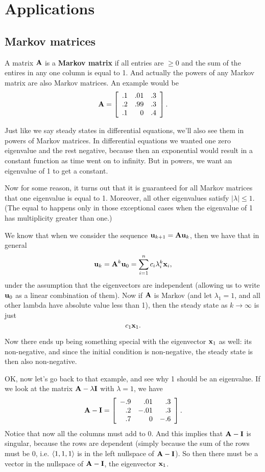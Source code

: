\section{Applications}

\subsection{Markov matrices}

A matrix $\boldsymbol{\mathbf{A}}$ is a \textbf{Markov matrix} if all entries are $\ge 0$ and the sum of the entires in any one column is equal to 1. And actually the powers of any Markov matrix are also Markov matrices. An example would be
\[ \boldsymbol{\mathbf{A}} = \left[ \begin{array}{rrrrrrrrrrrrrrrrrrrrrrrrr} .1&.01&.3\\.2&.99&.3\\.1&0&.4\\ \end{array} \right]. \]

Just like we say steady states in differential equations, we'll also see them in powers of Markov matrices. In differential equations we wanted one zero eigenvalue and the rest negative, because then an exponential would result in a constant function as time went on to infinity. But in powers, we want an eigenvalue of 1 to get a constant.

Now for some reason, it turns out that it is guaranteed for all Markov matrices that one eigenvalue is equal to 1. Moreover, all other eigenvalues satisfy $|\lambda| \le 1$. (The equal to happens only in those exceptional cases when the eigenvalue of 1 has multiplicity greater than one.)

We know that when we consider the sequence $\boldsymbol{\mathbf{u}}_{k+1}=\boldsymbol{\mathbf{A}} \boldsymbol{\mathbf{u}}_k$, then we have that in general
\[ \boldsymbol{\mathbf{u}}_k = \boldsymbol{\mathbf{A}}^k \boldsymbol{\mathbf{u}}_0 = \sum_{i=1}^n c_i \lambda_i^k \boldsymbol{\mathbf{x}}_i, \]
under the assumption that the eigenvectors are independent (allowing us to write $\boldsymbol{\mathbf{u}}_0$ as a linear combination of them). Now if $\boldsymbol{\mathbf{A}}$ is Markov (and let $\lambda_1 = 1$, and all other lambda have absolute value less than 1), then the steady state as $k \to \infty$ is just 
\[ c_1 \boldsymbol{\mathbf{x}}_1. \]

Now there ends up being something special with the eigenvector $\boldsymbol{\mathbf{x}}_1$ as well: its non-negative, and since the initial condition is non-negative, the steady state is then also non-negative. 

OK, now let's go back to that example, and see why 1 should be an eigenvalue. If we look at the matrix $\boldsymbol{\mathbf{A}} - \lambda \boldsymbol{\mathbf{I}}$ with $\lambda = 1$, we have
\[ \boldsymbol{\mathbf{A}} - \boldsymbol{\mathbf{I}} = \left[ \begin{array}{rrrrrrrrrrrrrrrrrrrrrrrrr} -.9&.01&.3\\.2&-.01&.3\\.7&0&-.6\\ \end{array} \right]. \]
Notice that now all the columns must add to 0. And this implies that $\boldsymbol{\mathbf{A}} - \boldsymbol{\mathbf{I}}$ is singular, because the rows are dependent (simply because the sum of the rows must be 0, i.e. $\langle 1,1,1 \rangle$ is in the left nullspace of $\boldsymbol{\mathbf{A}} - \boldsymbol{\mathbf{I}}$). So then there must be a vector in the nullspace of $\boldsymbol{\mathbf{A}}-\boldsymbol{\mathbf{I}}$, the eigenvector $\boldsymbol{\mathbf{x}}_1$. 

